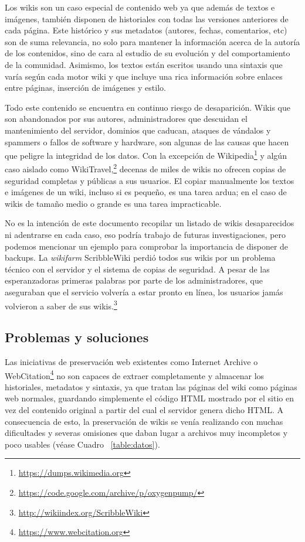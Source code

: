 \documentclass[14pt,twocolumn]{article}
\begin{document}
Los wikis son un caso especial de contenido web ya que además de textos e imágenes, también disponen de historiales con todas las versiones anteriores de cada página. Este histórico y sus metadatos (autores, fechas, comentarios, etc) son de suma relevancia, no solo para mantener la información acerca de la autoría de los contenidos, sino de cara al estudio de su evolución y del comportamiento de la comunidad. Asimismo, los textos están escritos usando una sintaxis que varía según cada motor wiki y que incluye una rica información sobre enlaces entre páginas, inserción de imágenes y estilo.

Todo este contenido se encuentra en continuo riesgo de desaparición. Wikis que son abandonados por sus autores, administradores que descuidan el mantenimiento del servidor, dominios que caducan, ataques de vándalos y spammers o fallos de software y hardware, son algunas de las causas que hacen que peligre la integridad de los datos. Con la excepción de Wikipedia\footnote{\href{https://dumps.wikimedia.org}{https://dumps.wikimedia.org}} y algún caso aislado como WikiTravel,\footnote{\href{https://code.google.com/archive/p/oxygenpump/}{https://code.google.com/archive/p/oxygenpump/}} decenas de miles de wikis no ofrecen copias de seguridad completas y públicas a sus usuarios. El copiar manualmente los textos e imágenes de un wiki, incluso si es pequeño, es una tarea ardua; en el caso de wikis de tamaño medio o grande es una tarea impracticable.

No es la intención de este documento recopilar un listado de wikis desaparecidos ni adentrarse en cada caso, eso podría trabajo de futuras investigaciones, pero podemos mencionar un ejemplo para comprobar la importancia de disponer de backups. La \textit{wikifarm} ScribbleWiki perdió todos sus wikis por un problema técnico con el servidor y el sistema de copias de seguridad. A pesar de las esperanzadoras primeras palabras por parte de los administradores, que aseguraban que el servicio volvería a estar pronto en línea, los usuarios jamás volvieron a saber de sus wikis.\footnote{\href{http://wikiindex.org/ScribbleWiki}{http://wikiindex.org/ScribbleWiki}}

\subsection{Problemas y soluciones}

Las iniciativas de preservación web existentes como Internet Archive o WebCitation\footnote{\href{https://www.webcitation.org}{https://www.webcitation.org}} no son capaces de extraer completamente y almacenar los historiales, metadatos y sintaxis, ya que tratan las páginas del wiki como páginas web normales, guardando simplemente el código HTML mostrado por el sitio en vez del contenido original a partir del cual el servidor genera dicho HTML. A consecuencia de esto, la preservación de wikis se venía realizando con muchas dificultades y severas omisiones que daban lugar a archivos muy incompletos y poco usables (véase Cuadro ~\ref{table:datos}).
\end{document}
